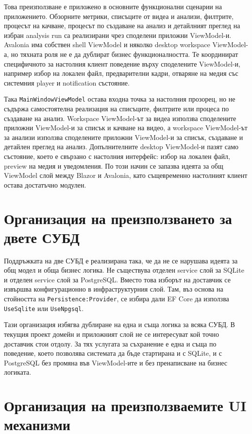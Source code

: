 Това преизползване е приложено в основните функционални сценарии на приложението. Обзорните метрики, списъците от видеа и анализи, филтрите, процесът на качване, процесът по създаване на анализ и детайлният преглед на избран analysis run са реализирани чрез споделени приложни ViewModel-и. Avalonia има собствен shell ViewModel и няколко desktop workspace ViewModel-а, но тяхната роля не е да дублират бизнес функционалността. Те координират специфичното за настолния клиент поведение върху споделените ViewModel-и, например избор на локален файл, предварителни кадри, отваряне на медия със системния player и notification състояние.

Така \texttt{MainWindowViewModel} остава входна точка за настолния прозорец, но не съдържа самостоятелна реализация на списъците, филтрите или процеса по създаване на анализ. Workspace ViewModel-ът за видеа използва споделените приложни ViewModel-и за списък и качване на видео, а workspace ViewModel-ът за анализи използва споделените приложни ViewModel-и за списък, създаване и детайлен преглед на анализ. Допълнителните desktop ViewModel-и пазят само състояние, което е свързано с настолния интерфейс: избор на локален файл, preview на медия и уведомления. По този начин се запазва идеята за общ ViewModel слой между Blazor и Avalonia, като същевременно настолният клиент остава достатъчно модулен.

\section{Организация на преизползването за двете СУБД}

Поддръжката на две СУБД е реализирана така, че да не се нарушава идеята за общ модел и обща бизнес логика. Не съществува отделен service слой за SQLite и отделен service слой за PostgreSQL. Вместо това изборът на доставчик се извършва конфигурационно в инфраструктурния слой. Там, въз основа на стойността на \texttt{Persistence:Provider}, се избира дали EF Core да използва \texttt{UseSqlite} или \texttt{UseNpgsql}.

Тази организация избягва дублиране на една и съща логика за всяка СУБД. В текущия проект домейн и приложният слой не се интересуват кой точно доставчик стои отдолу. За тях услугата за съхранение е една и съща по поведение, което позволява системата да бъде стартирана и с SQLite, и с PostgreSQL без промяна във ViewModel-ите и без пренаписване на бизнес логиката.

\section{Организация на преизползваемите UI механизми}

